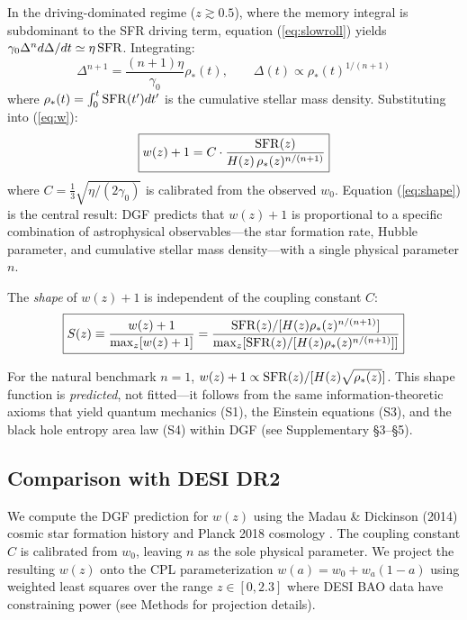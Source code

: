 \documentclass[12pt,a4paper]{article}
\begin{document}
In the driving-dominated regime ($z\gtrsim0.5$), where the memory integral is subdominant to the SFR driving term, equation (\ref{eq:slowroll}) yields $\gamma_0\Delta^n d\Delta/dt\simeq\eta\,{\rm SFR}$. Integrating:
\begin{equation}
\Delta^{n+1} = \frac{(n+1)\eta}{\gamma_0}\rho_*(t), \qquad
\Delta(t) \propto \rho_*(t)^{1/(n+1)}
\end{equation}
where $\rho_*(t)=\int_0^t{\rm SFR}(t')dt'$ is the cumulative stellar mass density. Substituting into (\ref{eq:w}):
\begin{equation}\label{eq:shape}
\boxed{w(z)+1 = C\cdot\frac{{\rm SFR}(z)}{H(z)\,\rho_*(z)^{n/(n+1)}}}
\end{equation}
where $C=\frac{1}{3}\sqrt{\eta/(2\gamma_0)}$ is calibrated from the observed $w_0$. Equation (\ref{eq:shape}) is the central result: DGF predicts that $w(z)+1$ is proportional to a specific combination of astrophysical observables---the star formation rate, Hubble parameter, and cumulative stellar mass density---with a single physical parameter $n$.

The {\it shape} of $w(z)+1$ is independent of the coupling constant $C$:
\begin{equation}\label{eq:shapefunc}
\boxed{S(z)\equiv\frac{w(z)+1}{\max_z[w(z)+1]} = \frac{{\rm SFR}(z)/[H(z)\rho_*(z)^{n/(n+1)}]}{\max_z[{\rm SFR}(z)/[H(z)\rho_*(z)^{n/(n+1)}]]}}
\end{equation}

For the natural benchmark $n=1$, $w(z)+1\propto{\rm SFR}(z)/[H(z)\sqrt{\rho_*(z)}]$. This shape function is {\it predicted}, not fitted---it follows from the same information-theoretic axioms that yield quantum mechanics (S1), the Einstein equations (S3), and the black hole entropy area law (S4) within DGF (see Supplementary \S3--\S5).

\subsection{Comparison with DESI DR2}

We compute the DGF prediction for $w(z)$ using the Madau \& Dickinson (2014) cosmic star formation history \cite{madau2014} and Planck 2018 cosmology \cite{planck2018}. The coupling constant $C$ is calibrated from $w_0$, leaving $n$ as the sole physical parameter. We project the resulting $w(z)$ onto the CPL parameterization $w(a)=w_0+w_a(1-a)$ using weighted least squares over the range $z\in[0,2.3]$ where DESI BAO data have constraining power (see Methods for projection details).
\end{document}
